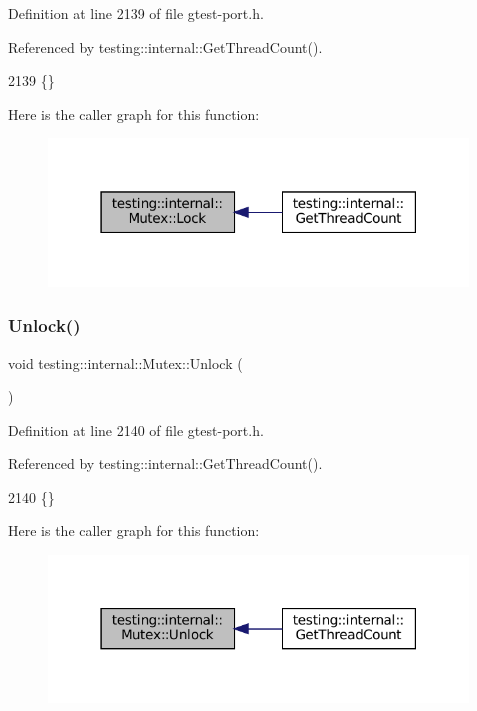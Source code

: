 Definition at line 2139 of file gtest-\/port.\+h.



Referenced by testing\+::internal\+::\+Get\+Thread\+Count().


\begin{DoxyCode}
2139 \{\}
\end{DoxyCode}
Here is the caller graph for this function\+:
\nopagebreak
\begin{figure}[H]
\begin{center}
\leavevmode
\includegraphics[width=316pt]{classtesting_1_1internal_1_1Mutex_ae7e2191886c00182176b23c4f4d049f8_icgraph}
\end{center}
\end{figure}
\mbox{\label{classtesting_1_1internal_1_1Mutex_a315188055de1be98884519ad84eff2e6}} 
\subsubsection{\texorpdfstring{Unlock()}{Unlock()}}
{\footnotesize\ttfamily void testing\+::internal\+::\+Mutex\+::\+Unlock (\begin{DoxyParamCaption}{ }\end{DoxyParamCaption})\hspace{0.3cm}{\ttfamily [inline]}}



Definition at line 2140 of file gtest-\/port.\+h.



Referenced by testing\+::internal\+::\+Get\+Thread\+Count().


\begin{DoxyCode}
2140 \{\}
\end{DoxyCode}
Here is the caller graph for this function\+:
\nopagebreak
\begin{figure}[H]
\begin{center}
\leavevmode
\includegraphics[width=316pt]{classtesting_1_1internal_1_1Mutex_a315188055de1be98884519ad84eff2e6_icgraph}
\end{center}
\end{figure}


